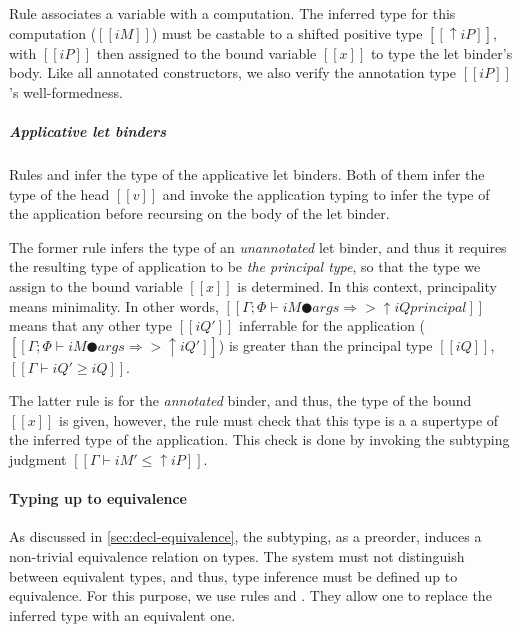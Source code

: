   Rule  associates a variable with a computation.
  The inferred type for this computation ($[[iM]]$) must be castable to a
  shifted positive type $[[↑iP]]$, with $[[iP]]$ then assigned to the bound
  variable $[[x]]$ to type the let binder's body. Like all annotated
  constructors, we also verify the annotation type $[[iP]]$'s well-formedness. 
  
\subparagraph*{Applicative let binders}
  Rules  and 
  infer the type of the applicative let binders.
  Both of them infer the type of the head $[[v]]$ 
  and invoke the application typing to infer the type of the application 
  before recursing on the body of the let binder.

  The former rule infers the type of an \emph{unannotated} let binder, and thus
  it requires the resulting type of application to be \emph{the principal type},
  so that the type we assign to the bound variable $[[x]]$ is determined.
  In this context, principality means minimality. In other words, 
  $[[Γ ; Φ ⊢ iM ● args ⇒> ↑iQ principal]]$ means that
  any other type $[[iQ']]$ inferrable for the application (\ie $[[Γ ; Φ ⊢ iM ● args ⇒> ↑iQ']]$)
  is greater than the principal type $[[iQ]]$, \ie $[[Γ ⊢ iQ' ≥ iQ]]$.

  The latter rule is for the \emph{annotated} binder,
  and thus, the type of the bound $[[x]]$ is given, 
  however, the rule must check that this type is a
  a supertype of the inferred type of the application. 
  This check is done by invoking the subtyping judgment
  $[[Γ ⊢ iM' ≤ ↑iP]]$.

\paragraph*{Typing up to equivalence}
  As discussed in \cref{sec:decl-equivalence}, the subtyping, as a preorder, 
  induces a non-trivial equivalence relation on types. 
  The system must not distinguish between equivalent types,
  and thus, type inference must be defined up to equivalence. 
  For this purpose, we use rules   
  and .
  They allow one to replace the inferred type with an equivalent one.  

